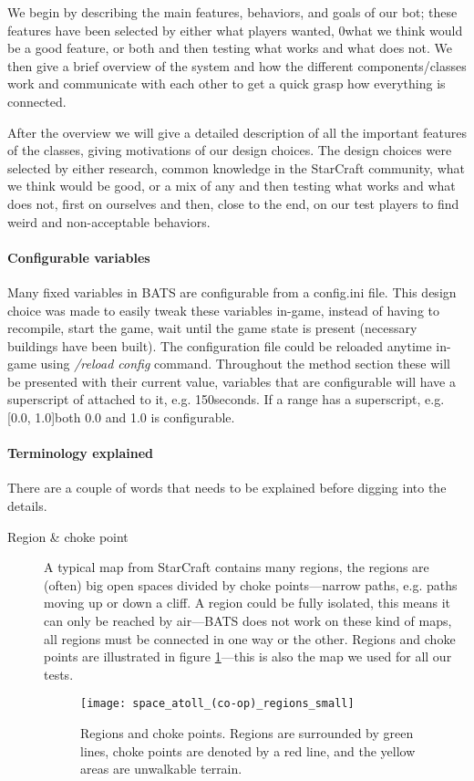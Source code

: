 
We begin by describing the main features, behaviors, and goals of our bot; these features have been selected by either what players wanted, 0what we think would be a good feature, or both and then testing what works and what does not. We then give a brief overview of the system and how the different components/classes work and communicate with each other to get a quick grasp how everything is connected.

After the overview we will give a detailed description of all the important features of the classes, giving motivations of our design choices. The design choices were selected by either research, common knowledge in the StarCraft community, what we think would be good, or a mix of any and then testing what works and what does not, first on ourselves and then, close to the end, on our test players to find weird and non-acceptable behaviors.

\paragraph{Configurable variables}
Many fixed variables in BATS are configurable from a config.ini file. This design choice was made to easily tweak these variables in-game, instead of having to recompile, start the game, wait until the game state is present (necessary buildings have been built). The configuration file could be reloaded anytime in-game using \emph{/reload config} command. Throughout the method section these will be presented with their current value, variables that are configurable will have a superscript of \conf attached to it, e.g. 150\conf seconds. If a range has a superscript, e.g. [0.0, 1.0]\conf both 0.0 and 1.0 is configurable.

\paragraph{Terminology explained}
There are a couple of words that needs to be explained before digging into the details.

\begin{description}
	\item[Region \& choke point] A typical map from StarCraft contains many regions, the regions are (often) big open spaces divided by choke points—narrow paths, e.g. paths moving up or down a cliff. A region could be fully isolated, this means it can only be reached by air—BATS does not work on these kind of maps, all regions must be connected in one way or the other. Regions and choke points are illustrated in figure \ref{fig:region_and_choke_points}—this is also the map we used for all our tests.
	\begin{figure}[htb]
		\centering
		\texttt{[image: space\_atoll\_(co-op)\_regions\_small]}
		\caption[Regions and choke points]{Regions and choke points. Regions are surrounded by green lines, choke points are denoted by a red line, and the yellow areas are unwalkable terrain.}
		\label{fig:region_and_choke_points}
	\end{figure}
\end{description}